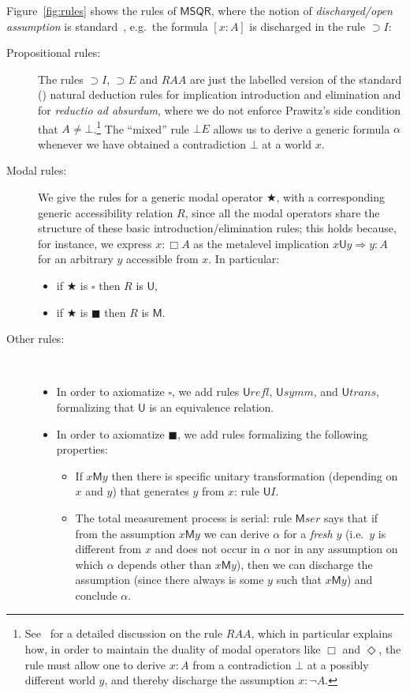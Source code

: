 \documentclass[times, 10pt]{article}
\newcommand{\varimp}{\supset}
\newcommand{\MSQR}{\textsf{MSQR}}
\newcommand{\measB}{\blacksquare}
\newcommand{\uniB}{\square}
\newcommand{\Un}{\textsf{U}}
\newcommand{\Me}{\textsf{M}}
\newcommand{\RAA}{\mathit{RAA}}
\newcommand{\Unr}{\Un \mathit{refl}}
\newcommand{\Uns}{\Un \mathit{symm}}
\newcommand{\Unt}{\Un \mathit{trans}}
\renewcommand{\Un}{\mathsf{U}}
\renewcommand{\Me}{\mathsf{M}}
\newcommand{\Meser}{\Me\mathit{ser}}
\begin{document}
Figure~\ref{fig:rules} shows the rules of $\MSQR$, where the notion of \emph{discharged/open assumption} is standard~\cite{Prawitz65,TroelstraSchwichtenberg96}, e.g.~the formula $[x:A]$ is 
discharged in the rule $\varimp I$:
\begin{description}
\item[Propositional rules:] The rules $\varimp I$, $\varimp E$ and $\RAA$ are just the labelled version of the standard (\cite{Prawitz65,TroelstraSchwichtenberg96}) natural deduction rules for implication introduction and elimination and for 
  \emph{reductio ad absurdum}, where we do not enforce Prawitz's side
  condition that $A \neq \bot$.\footnote{See~\cite{Vigano00a} for a
    detailed discussion on the rule $\RAA$, which in particular
    explains how, in order to maintain the duality of modal operators
    like $\Box$ and $\Diamond$, the rule must allow one to derive
    $x:A$ from a contradiction $\bot$ at a possibly different world
    $y$, and thereby discharge the assumption $x: \neg A$.} The
  ``mixed'' rule $\bot E$ allows us to derive a generic formula
  $\alpha$ whenever we have obtained a contradiction $\bot$ at a world
  $x$.
\item[Modal rules:] We give the rules for a generic modal operator $\bigstar$, with a corresponding generic accessibility relation $R$, since all the modal operators share the structure of these basic introduction/elimination rules; this holds because, for instance, we express $x: \Box A$ as the metalevel 
implication $x \Un y \Longrightarrow y:A$ for an arbitrary $y$ accessible from $x$. In particular:
\begin{itemize}
\item if  $\bigstar$ is $\uniB$ then $R$ is $\Un$,
\item if $\bigstar$ is $\measB$ then $R$ is $\Me$.
\end{itemize}
\item[Other rules:] \
\begin{itemize} 
\item In order to axiomatize $\uniB$, 
we add rules $\Unr$, $\Uns$, and $\Unt$, formalizing that $\Un$ is an equivalence relation.
\item 
In order to axiomatize $\measB$, 
we add rules formalizing the following properties:
\begin{itemize}
\item If $x\Me y$ then there is specific unitary transformation
  (depending on $x$ and $y$) that generates $y$ from $x$: rule $\Un I$.
\item The total measurement process is serial: rule $\Meser$ says that if from the assumption $x \Me y$ we can derive $\alpha$ for a \emph{fresh} $y$ (i.e.~$y$ is different from $x$ and does not occur in $\alpha$ nor in any assumption on which $\alpha$ depends other than $x \Me y$), then we can discharge the assumption (since there always is some $y$ such that $x \Me y$) and conclude $\alpha$.

\end{itemize}
\end{itemize}
\end{description}
\end{document}

